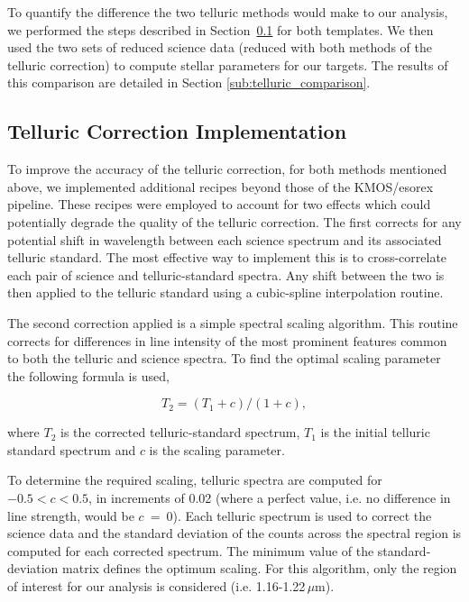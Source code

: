 To quantify the difference the two telluric methods would make to our analysis,
we performed the steps described in
Section~\ref{sub:ngc6822_telluric_correction} for both templates.
We then used the two sets of reduced science data
(reduced with both methods of the telluric correction) to compute stellar parameters for our targets.
The results of this comparison are detailed in Section
\ref{sub:telluric_comparison}.


\subsection{Telluric Correction Implementation} %
\label{sub:ngc6822_telluric_correction}

To improve the accuracy of the telluric correction,
for both methods mentioned above,
we implemented additional recipes beyond those of the KMOS/esorex pipeline.
These recipes were employed to account for two effects which could potentially degrade the quality of the telluric correction.
The first corrects for any potential shift in wavelength between each science spectrum and its associated telluric standard.
The most effective way to implement this is to cross-correlate each pair of science and telluric-standard spectra.
Any shift between the two is then applied to the telluric standard using a cubic-spline interpolation routine.

The second correction applied is a simple spectral scaling algorithm.
This routine corrects for differences in line intensity of the most prominent features common to both the telluric and science spectra.
To find the optimal scaling parameter the following formula is used,

\begin{equation} \label{eq:shiftandres}
T_{2} = (T_{1} + c) / (1 + c),
\end{equation}

\noindent where $T_{2}$ is the corrected telluric-standard spectrum,
$T_{1}$ is the initial telluric standard spectrum and $c$ is the scaling parameter.

To determine the required scaling,
telluric spectra are computed for $-0.5<c<0.5$, in increments of 0.02
(where a perfect value, i.e. no difference in line strength, would be $c$~=~0).
Each telluric spectrum is used to correct the science data and the standard deviation of the counts across the spectral region is computed for each corrected spectrum.
The minimum value of the standard-deviation matrix defines the optimum scaling.
For this algorithm, only the region of interest for our analysis is considered
(i.e. 1.16-1.22\,$\mu$m).

